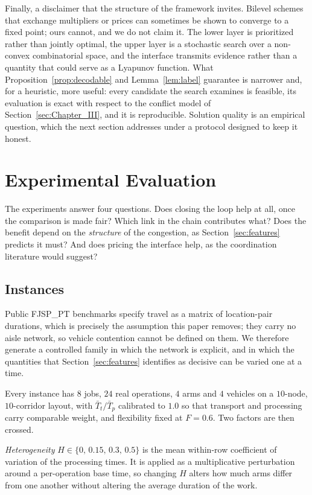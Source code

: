 \documentclass[manuscript,screen,review]{acmart}
\begin{document}
Finally, a disclaimer that the structure of the framework invites. Bilevel
schemes that exchange multipliers or prices can sometimes be shown to converge
to a fixed point; ours cannot, and we do not claim it. The lower layer is
prioritized rather than jointly optimal, the upper layer is a stochastic search
over a non-convex combinatorial space, and the interface transmits evidence
rather than a quantity that could serve as a Lyapunov function. What
Proposition~\ref{prop:decodable} and Lemma~\ref{lem:label} guarantee is
narrower and, for a heuristic, more useful: every candidate the search examines
is feasible, its evaluation is exact with respect to the conflict model of
Section~\ref{sec:Chapter_III}, and it is reproducible. Solution quality is an
empirical question, which the next section addresses under a protocol designed
to keep it honest.

\section{Experimental Evaluation}
\label{sec:Chapter_V}

The experiments answer four questions. Does closing the loop help at all, once
the comparison is made fair? Which link in the chain contributes what? Does the
benefit depend on the \emph{structure} of the congestion, as
Section~\ref{sec:features} predicts it must? And does pricing the interface
help, as the coordination literature would suggest?

\subsection{Instances}
\label{sec:instances}

Public FJSP\_PT benchmarks specify travel as a matrix of location-pair
durations, which is precisely the assumption this paper removes; they carry no
aisle network, so vehicle contention cannot be defined on them. We therefore
generate a controlled family in which the network is explicit, and in which the
quantities that Section~\ref{sec:features} identifies as decisive can be varied
one at a time.

Every instance has $8$ jobs, $24$ real operations, $4$ arms and $4$ vehicles on
a $10$-node, $10$-corridor layout, with $\bar{T}_t/\bar{T}_p$ calibrated to
$1.0$ so that transport and processing carry comparable weight, and flexibility
fixed at $F=0.6$. Two factors are then crossed.

\emph{Heterogeneity} $H\in\{0,\,0.15,\,0.3,\,0.5\}$ is the mean within-row
coefficient of variation of the processing times. It is applied as a
multiplicative perturbation around a per-operation base time, so changing $H$
alters how much arms differ from one another without altering the average
duration of the work.
\end{document}
